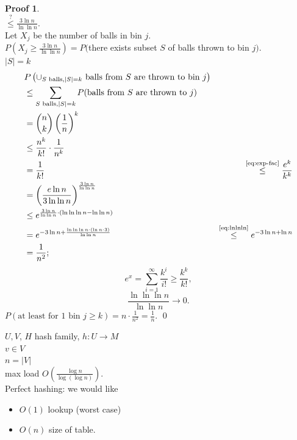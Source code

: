 \documentclass[a4paper, 12pt]{book}
\theoremstyle{definition}
\newtheorem{pro}[counter]{Proof}
\theoremstyle{remark}
\begin{document}
\begin{pro} \text{} \\
  $\stackrel{?}{\leq} \frac{3 \ln n}{\ln \ln n}$. \\
  Let $X_j$ be the number of balls in bin $j$. \\
  $P\left(X_j \geq \frac{3 \ln n}{\ln \ln n}\right) = P($there exists subset $S$ of balls thrown to bin $j)$. \\
  $|S| = k$
  \begin{align*}
    &P\left(\cup_{S \text{ balls}, |S|=k} \text{ balls from $S$ are thrown to bin }j\right) \\
    &\leq \sum_{S \text{ balls}, |S|=k} P(\text{balls from $S$ are thrown to }j) \\
    &= \binom{n}{k} \left(\frac{1}{n}\right)^k \\
    &\leq \frac{n^k}{k!} \cdot \frac{1}{n^k} \\
    &= \frac{1}{k!}
    &\stackrel{\refeq{eq:exp-fac}}{\leq} \frac{e^k}{k^k} \\
    &= \left(\frac{e \ln n}{3 \ln \ln n}\right)^{\frac{3 \ln n}{\ln \ln n}} \\
    &\leq e^{\frac{3 \ln n}{\ln \ln n} \cdot \left(\ln \ln \ln n - \ln \ln n\right)} \\
    &= e^{-3 \ln n + \frac{\ln \ln \ln n \cdot (\ln n \cdot 3)}{\ln \ln n}}
    &\stackrel{\refeq{eq:lnlnln}}{\leq} e^{-3 \ln n + \ln n} \\
    &= \frac{1}{n^2};
  \end{align*}
  \begin{equation}
    \label{eq:exp-fac}
    e^x = \sum_{i=1}^{\infty} \frac{k^i}{i!} \geq \frac{k^k}{k!},
  \end{equation}
  \begin{equation}
    \label{eq:lnlnln}
    \frac{\ln \ln \ln n}{\ln \ln n} \to 0.
  \end{equation}
  $P(\text{at least for $1$ bin }j \geq k) = n \cdot \frac{1}{n^2} = \frac{1}{n}$.
  \qed
\end{pro}



$U, V$, $H$ hash family, $h: U \to M$ \\
$v \in V$ \\
$n = |V|$ \\
max load $O\left(\frac{\log n}{\log (\log n)}\right)$. \\
Perfect hashing: we would like
\begin{itemize}
  \item $O(1)$ lookup (worst case)
  \item $O(n)$ size of table.
\end{itemize}
\end{document}
